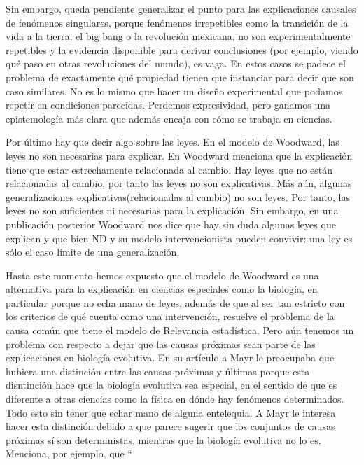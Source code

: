 Sin embargo, queda pendiente generalizar el punto para las explicaciones causales de fenómenos singulares, porque fenómenos irrepetibles como la transición de la vida a la tierra, el big bang o la revolución mexicana, no son experimentalmente repetibles y la evidencia disponible para derivar conclusiones (por ejemplo, viendo qué paso en otras revoluciones del mundo), es vaga. En estos casos se padece el problema de exactamente qué propiedad tienen que instanciar para decir que son caso similares. No es lo mismo que hacer un diseño experimental que podamos repetir en condiciones parecidas. Perdemos expresividad, pero ganamos una epistemología más clara que además encaja con cómo se trabaja en ciencias.

Por último hay que decir algo sobre las leyes. En el modelo de Woodward, las leyes no son necesarias para explicar. En \cite{Woodward2000} Woodward menciona que la explicación tiene que estar estrechamente relacionada al cambio. Hay leyes que no están relacionadas al cambio, por tanto las leyes no son explicativas. Más aún, algunas generalizaciones explicativas(relacionadas al cambio) no son leyes. Por tanto, las leyes no son suficientes ni necesarias para la explicación. Sin embargo, en una publicación posterior \citeyear{Woodward2003} Woodward nos dice que hay sin duda algunas leyes que explican y que bien ND y su modelo intervencionista pueden convivir: una ley es sólo el caso límite de una generalización.

Hasta este momento hemos expuesto que el modelo de Woodward es una alternativa para la explicación en ciencias especiales como la biología, en particular porque no echa mano de leyes, además de que al ser tan estricto con los criterios de qué cuenta como una intervención, resuelve el problema de la causa común que tiene el modelo de Relevancia estadística. Pero aún tenemos un problema con respecto a dejar que las causas próximas sean parte de las explicaciones en biología evolutiva. En su artículo a Mayr \citeyear{Mayr1998} le preocupaba que hubiera una distinción entre las causas próximas y últimas porque esta disntinción hace que la biología evolutiva sea especial, en el sentido de que es diferente a otras ciencias como la física en dónde hay fenómenos determinados. Todo esto sin tener que echar mano de alguna entelequia. A Mayr le interesa hacer esta distinción debido a que parece sugerir que los conjuntos de causas próximas sí son deterministas, mientras que la biología evolutiva no lo es. Menciona, por ejemplo, que ``

